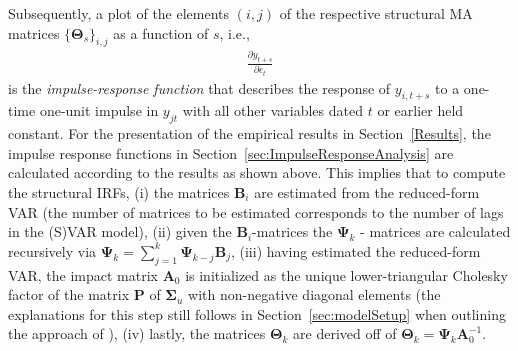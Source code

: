 \documentclass[a4paper,11pt,listof=nochaptergap,oneside,pointednumbers,bibtotoc,bigheadings,liststotoc,hidelinks]{scrbook}
\theoremstyle{mysatz}
\theoremstyle{mydefinition}
\theoremstyle{mytheorem}
\theoremstyle{mybemerkung}
\newcommand{\vect}[1]{\boldsymbol{\mathbf{#1}}}
\begin{document}
Subsequently, a plot of the elements $(i, j)$ of the respective structural MA matrices $\{\vect{\Theta}_s\}_{i, j}$ as a function of $s$, i.e., 
\begin{equation} \label{eq:svar10}
\begin{split}
 		\frac{\partial y_{t+s}}{\partial \epsilon_{t}}
\end{split}								
\end{equation}
is the \textit{impulse-response function} that describes the response of $y_{i, t+s}$ to a one-time one-unit impulse in $y_{jt}$ with all other variables dated $t$ or earlier held constant. For the presentation of the empirical results in Section~\ref{Results}, the impulse response functions in Section~\ref{sec:ImpulseResponseAnalysis} are calculated according to the results as shown above. This implies that to compute the structural IRFs, (i) the matrices $\vect{B}_i$ are estimated from the reduced-form VAR (the number of matrices to be estimated corresponds to the number of lags in the (S)VAR model), (ii) given the $\vect{B}_i$-matrices the $\vect{\Psi}_k$ - matrices are calculated recursively via $\vect{\Psi}_k = \sum\limits_{j=1}^k \vect{\Psi}_{k-j}\vect{B}_j$, (iii) having estimated the reduced-form VAR, the impact matrix $\vect{A}_0$ is initialized as the unique lower-triangular Cholesky factor of the matrix $\vect{P}$ of $\vect{\Sigma}_u$ with non-negative diagonal elements (the explanations for this step still follows in Section~\ref{sec:modelSetup} when outlining the approach of \citealp{ludvigsonetal:19}), (iv) lastly, the matrices $\vect{\Theta}_k$ are derived off of $\vect{\Theta}_k = \vect{\Psi}_k\vect{A}_0^{-1}$. \\
\end{document}
